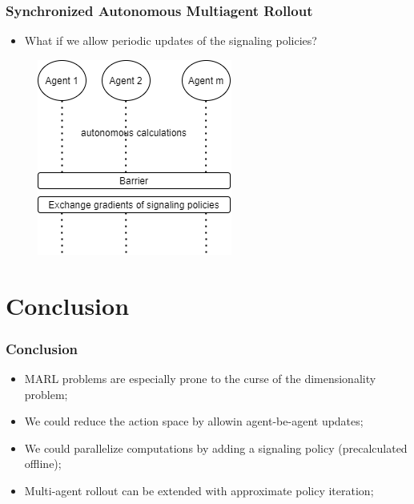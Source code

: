 \documentclass{beamer}
\begin{document}
\begin{frame}
\frametitle{Synchronized Autonomous Multiagent Rollout}
	
	\begin{itemize}
		\item What if we allow periodic updates 
		of the signaling policies?
		
	\end{itemize}
	
	
\begin{figure}
	\includegraphics[scale=0.65]{3b_idea}
\end{figure}



\end{frame}




    \section{Conclusion}

    \begin{frame}
        \frametitle{Conclusion}
        \begin{itemize}
            \item MARL problems are especially prone to the
            curse of the dimensionality problem;
            
            \item We could reduce the action space 
            by allowin agent-be-agent updates;

            \item We could parallelize computations
            by adding a signaling policy (precalculated offline);
            
            \item Multi-agent rollout can be extended with 
            approximate policy iteration;

            
        \end{itemize}
    \end{frame}
\end{document}
